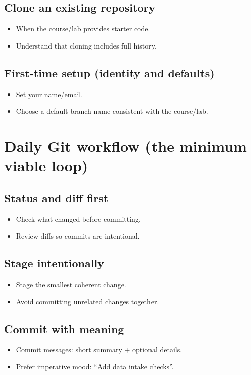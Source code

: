 \subsection{Clone an existing repository}
\begin{itemize}
\item When the course/lab provides starter code.
\item Understand that cloning includes full history.
\end{itemize}

\subsection{First-time setup (identity and defaults)}
\begin{itemize}
\item Set your name/email.
\item Choose a default branch name consistent with the course/lab.
\end{itemize}

\section{Daily Git workflow (the minimum viable loop)}
\subsection{Status and diff first}
\begin{itemize}
\item Check what changed before committing.
\item Review diffs so commits are intentional.
\end{itemize}

\subsection{Stage intentionally}
\begin{itemize}
\item Stage the smallest coherent change.
\item Avoid committing unrelated changes together.
\end{itemize}

\subsection{Commit with meaning}
\begin{itemize}
\item Commit messages: short summary + optional details.
\item Prefer imperative mood: ``Add data intake checks''.
\end{itemize}

